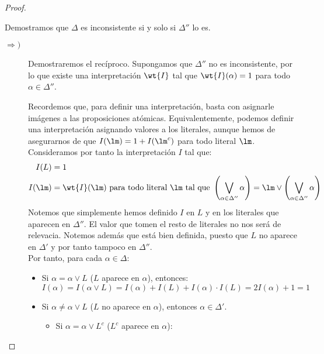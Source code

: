 \documentclass[12pt]{article}
\begin{document}
\begin{ejercicio}
\begin{proof}
\begin{description}
                Demostramos que $\Delta$ es inconsistente si y solo si $\Delta''$ lo es.
                \begin{description}
                    \item[$\Longrightarrow)$] Demostraremos el recíproco. Supongamos que $\Delta''$ no es inconsistente, por lo que existe una interpretación $\wt{I}$ tal que $\wt{I}(\alpha)=1$ para todo $\alpha\in \Delta''$.

                    Recordemos que, para definir una interpretación, basta con asignarle imágenes a las proposiciones atómicas. Equivalentemente, podemos definir una interpretación asignando valores a los literales, aunque hemos de asegurarnos de que $I(\lm)=1+I(\lm^c)$ para todo literal $\lm$.
                    Consideramos por tanto la interpretación $I$ tal que:
                    \begin{align*}
                        I(L)&=1\\
                        I(\lm)&=\wt{I}(\lm)\ \text{para todo literal}\ \lm\ \text{tal que} \ \left(\bigvee_{\alpha\in \Delta''} \alpha\right)=\lm\lor \left(\bigvee_{\alpha\in \Delta''} \alpha\right)
                    \end{align*}
                    Notemos que simplemente hemos definido $I$ en $L$ y en los literales que aparecen en $\Delta''$. El valor que tomen el resto de literales no nos será de relevacia. Notemos además que está bien definida, puesto que $L$ no aparece en $\Delta'$ y por tanto tampoco en $\Delta''$.\\

                    Por tanto, para cada $\alpha\in \Delta$:
                    \begin{itemize}
                        \item Si $\alpha=\alpha\lor L$ ($L$ aparece en $\alpha$), entonces:
                        \begin{equation*}
                            I(\alpha)=I(\alpha\lor L)=I(\alpha)+I(L)+I(\alpha)\cdot I(L)=2I(\alpha)+1=1
                        \end{equation*}

                        \item Si $\alpha\neq \alpha\lor L$ ($L$ no aparece en $\alpha$), entonces $\alpha\in \Delta'$.
                        \begin{itemize}
                            \item Si $\alpha=\alpha\lor L^c$ ($L^c$ aparece en $\alpha$):
                            

\end{itemize}
\end{itemize}
\end{description}
\end{description}
\end{proof}
\end{ejercicio}
\end{document}
